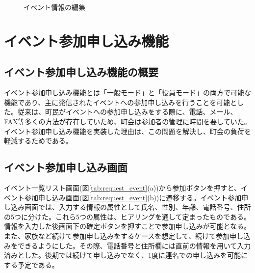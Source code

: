 \begin{figure}[htbp]
\begin{center}
\begin{tabular}{c}
    \end{tabular}
    \caption{イベント情報の編集}
    \label{tab:edit_event}
  \end{center}
\end{figure}

\section{イベント参加申し込み機能}%
\subsection{イベント参加申し込み機能の概要}%
イベント参加申し込み機能とは「一般モード」と「役員モード」の両方で可能な機能であり、主に発信されたイベントへの参加申し込みを行うことを可能とした。従来は、町民がイベントへの参加申し込みをする際に、電話、メール、FAX等多くの方法が存在していため、町会は参加者の管理に時間を要していた。イベント参加申し込み機能を実装した理由は、この問題を解決し、町会の負荷を軽減するためである。

\subsection{イベント参加申し込み画面}%
イベント一覧リスト画面(図\ref{tab:request_event}(a))から参加ボタンを押すと、イベント参加申し込み画面(図\ref{tab:request_event}(b))に遷移する。イベント参加申し込み画面では、入力する情報の属性として氏名、性別、年齢、電話番号、住所の5つに分けた。これら5つの属性は、ヒアリングを通して定まったものである。情報を入力した後画面下の確定ボタンを押すことで参加申し込みが可能となる。また、家族など続けて参加申し込みをするケースを想定して、続けて参加申し込みをできるようにした。その際、電話番号と住所欄には直前の情報を用いて入力済みとした。後期では続けて申し込みでなく、1度に連名での申し込みを可能にする予定である。

